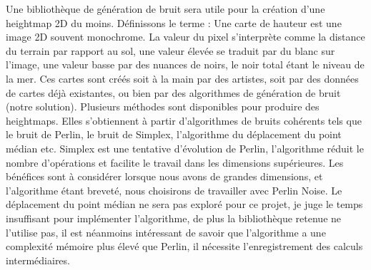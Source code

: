 \documentclass[12pt]{report}
\begin{document}
Une bibliothèque de génération de bruit sera utile pour la création d'une heightmap 2D du moins. Définissons le terme : Une carte de hauteur est une image 2D souvent monochrome. La valeur du pixel s'interprète comme la distance du terrain par rapport au sol, une valeur élevée se traduit par du blanc sur l'image, une valeur basse par des nuances de noirs, le noir total étant le niveau de la mer. Ces cartes sont créés soit à la main par des artistes, soit par des données de cartes déjà existantes, ou bien par des algorithmes de génération de bruit (notre solution).
Plusieurs méthodes sont disponibles pour produire des heightmaps. Elles s'obtiennent à partir d'algorithmes de bruits cohérents tels que le bruit de Perlin, le bruit de Simplex, l'algorithme du déplacement du point médian etc. Simplex est une tentative d'évolution de Perlin, l'algorithme réduit le nombre d'opérations et facilite le travail dans les dimensions supérieures. Les bénéfices sont à considérer lorsque nous avons de grandes dimensions, et l'algorithme étant breveté, nous choisirons de travailler avec Perlin Noise. Le déplacement du point médian ne sera pas exploré pour ce projet, je juge le temps insuffisant pour implémenter l'algorithme, de plus la bibliothèque retenue ne l'utilise pas, il est néanmoins intéressant de savoir que l'algorithme a une complexité mémoire plus élevé que Perlin, il nécessite l'enregistrement des calculs intermédiaires.
\end{document}
